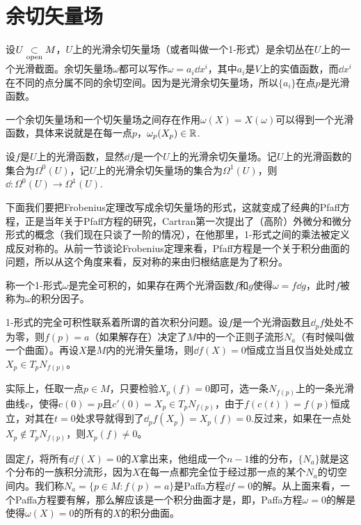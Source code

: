 \section{余切矢量场}

\para 设$U\underset{\mathrm{open}}{\subset} M$，$U$上的光滑余切矢量场（或者叫做一个1-形式）是余切丛在$U$上的一个光滑截面。余切矢量场$\omega$都可以写作$\omega=a_i\dd x^i$，其中$a_i$是$V$上的实值函数，而$\dd x^i$在不同的点分属不同的余切空间。因为是光滑余切矢量场，所以$\{a_i\}$在点$p$是光滑函数。

一个余切矢量场和一个切矢量场之间存在作用$\omega(X)=X(\omega)$可以得到一个光滑函数，具体来说就是在每一点$p$，$\omega_p(X_p)\in \mathbb{R}$.


\para 设$f$是$U$上的光滑函数，显然$\dd f$是一个$U$上的光滑余切矢量场。记$U$上的光滑函数的集合为$\Omega^0(U)$，记$U$上的光滑余切矢量场的集合为$\Omega^1(U)$，则$\dd: \Omega^0(U)\to \Omega^1(U)$.

下面我们要把Frobenius定理改写成余切矢量场的形式，这就变成了经典的Pfaff方程，正是当年关于Pfaff方程的研究，Cartran第一次提出了（高阶）外微分和微分形式的概念（我们现在只谈了一阶的情况），在他那里，1-形式之间的乘法被定义成反对称的。从前一节谈论Frobenius定理来看，Pfaff方程是一个关于积分曲面的问题，所以从这个角度来看，反对称的来由归根结底是为了积分。

\para 称一个1-形式$\omega$是完全可积的，如果存在两个光滑函数$f$和$g$使得$\omega=f\dd g$，此时$f$被称为$\omega$的积分因子。

1-形式的完全可积性联系着所谓的首次积分问题。设$f$是一个光滑函数且$\dd_p f$处处不为零，则$f(p)=a$（如果解存在）决定了$M$中的一个正则子流形$N_a$（有时候叫做一个曲面）。再设$X$是$M$内的光滑矢量场，则$\dd f(X)=0$恒成立当且仅当处处成立$X_p\in T_pN_{f(p)}$。

实际上，任取一点$p\in M$，只要检验$X_p(f)=0$即可，选一条$N_{f(p)}$上的一条光滑曲线$c$，使得$c(0)=p$且$c'(0)=X_p\in T_pN_{f(p)}$，由于$f(c(t))=f(p)$恒成立，对其在$t=0$处求导就得到了$\dd_pf(X_p)=X_p(f)=0$.反过来，如果在一点处$X_p\notin T_pN_{f(p)}$，则$X_p(f)\neq 0$。

固定$f$，将所有$\dd f(X)=0$的$X$拿出来，他组成一个$n-1$维的分布，$\{N_a\}$就是这个分布的一族积分流形，因为$X$在每一点都完全位于经过那一点的某个$N_a$的切空间内。我们称$N_a=\{p\in M:f(p)=a\}$是Paffa方程$\dd f=0$的解。从上面来看，一个Paffa方程要有解，那么解应该是一个积分曲面才是，即，Paffa方程$\omega=0$的解是使得$\omega(X)=0$的所有的$X$的积分曲面。

